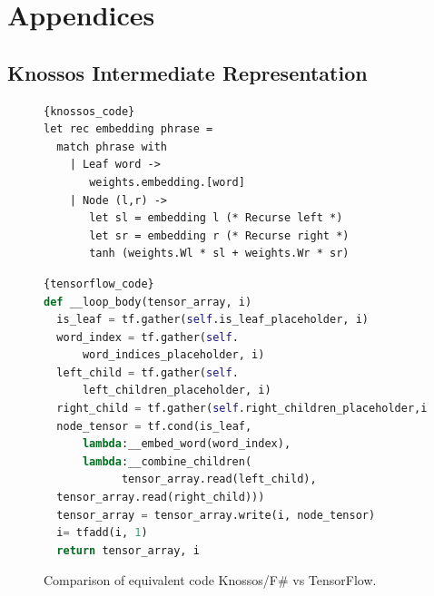 \documentclass[fullpage,twocolumn]{article} %
\begin{document}
{
\small


}

\clearpage 
\section*{Appendices}
\renewcommand\thesubsection{Appendix \Alph{subsection}}

\subsection{Knossos Intermediate Representation}
\label{sec:knossos-ir}
\begin{figure}
  \begin{center}
    \begin{minipage}[t]{0.48\textwidth}
  
    \begin{lstlisting}[caption=F\# code for TreeNN, frame=tlrb, language=caml]{knossos_code}
let rec embedding phrase =
  match phrase with
    | Leaf word ->  
       weights.embedding.[word]
    | Node (l,r) ->
       let sl = embedding l (* Recurse left *)
       let sr = embedding r (* Recurse right *)
       tanh (weights.Wl * sl + weights.Wr * sr)
    \end{lstlisting}
    \end{minipage}
    \hspace{0.015\textwidth}
     \begin{minipage}[t]{0.48\textwidth}
    \begin{lstlisting}[caption=TensorFlow code,frame=tlrb,language=python]{tensorflow_code}
def __loop_body(tensor_array, i)
  is_leaf = tf.gather(self.is_leaf_placeholder, i)
  word_index = tf.gather(self.
      word_indices_placeholder, i)
  left_child = tf.gather(self.
      left_children_placeholder, i)
  right_child = tf.gather(self.right_children_placeholder,i)
  node_tensor = tf.cond(is_leaf,
      lambda:__embed_word(word_index),
      lambda:__combine_children(
            tensor_array.read(left_child),
  tensor_array.read(right_child)))
  tensor_array = tensor_array.write(i, node_tensor)
  i= tfadd(i, 1)
  return tensor_array, i
    \end{lstlisting}
    \end{minipage}
  \end{center}
  \caption{Comparison of equivalent code Knossos/F\# vs TensorFlow.}
  \label{fig-comparison}
  \end{figure}
  
\end{document}
